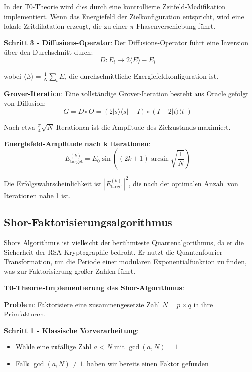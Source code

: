 \documentclass[12pt,a4paper]{article}
\theoremstyle{definition}
\theoremstyle{remark}
\begin{document}
In der T0-Theorie wird dies durch eine kontrollierte Zeitfeld-Modifikation implementiert. Wenn das Energiefeld der Zielkonfiguration entspricht, wird eine lokale Zeitdilatation erzeugt, die zu einer $\pi$-Phasenverschiebung f{\"u}hrt.

\textbf{Schritt 3 - Diffusions-Operator}:
Der Diffusions-Operator f{\"u}hrt eine Inversion {\"u}ber den Durchschnitt durch:
\begin{equation}
	D: E_i \rightarrow 2\langle E \rangle - E_i
\end{equation}

wobei $\langle E \rangle = \frac{1}{N}\sum_i E_i$ die durchschnittliche Energiefeldkonfiguration ist.

\textbf{Grover-Iteration}:
Eine vollst{\"a}ndige Grover-Iteration besteht aus Oracle gefolgt von Diffusion:
\begin{equation}
	G = D \circ O = (2|s\rangle\langle s| - I) \circ (I - 2|t\rangle\langle t|)
\end{equation}

Nach etwa $\frac{\pi}{4}\sqrt{N}$ Iterationen ist die Amplitude des Zielzustands maximiert.

\textbf{Energiefeld-Amplitude nach k Iterationen}:
\begin{equation}
	E_{\text{target}}^{(k)} = E_0 \sin\left((2k+1)\arcsin\sqrt{\frac{1}{N}}\right)
\end{equation}

Die Erfolgswahrscheinlichkeit ist $|E_{\text{target}}^{(k)}|^2$, die nach der optimalen Anzahl von Iterationen nahe 1 ist.

\subsection{Shor-Faktorisierungsalgorithmus}

Shors Algorithmus ist vielleicht der ber{\"u}hmteste Quantenalgorithmus, da er die Sicherheit der RSA-Kryptographie bedroht. Er nutzt die Quantenfourier-Transformation, um die Periode einer modularen Exponentialfunktion zu finden, was zur Faktorisierung gro{\ss}er Zahlen f{\"u}hrt.

\textbf{T0-Theorie-Implementierung des Shor-Algorithmus}:

\textbf{Problem}: Faktorisiere eine zusammengesetzte Zahl $N = p \times q$ in ihre Primfaktoren.

\textbf{Schritt 1 - Klassische Vorverarbeitung}:
\begin{itemize}
	\item W{\"a}hle eine zuf{\"a}llige Zahl $a < N$ mit $\gcd(a, N) = 1$
	\item Falls $\gcd(a, N) \neq 1$, haben wir bereits einen Faktor gefunden
\end{itemize}
\end{document}
